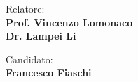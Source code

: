 \begin{titlepage}
\begin{minipage}[t]{0.47\textwidth}
	{\large{Relatore:}{\normalsize\vspace{3mm}
	\bf\\ \large{Prof. Vincenzo Lomonaco} \normalsize\vspace{3mm}\bf \\ \large{Dr. Lampei Li}}}
\end{minipage}
\hfill
\begin{minipage}[t]{0.47\textwidth}\raggedleft
	{\large{Candidato:}{\normalsize\vspace{3mm} \bf\\ \large{Francesco Fiaschi}}}
\end{minipage}

\vspace{30mm}
\hrulefill
\\

\end{titlepage}